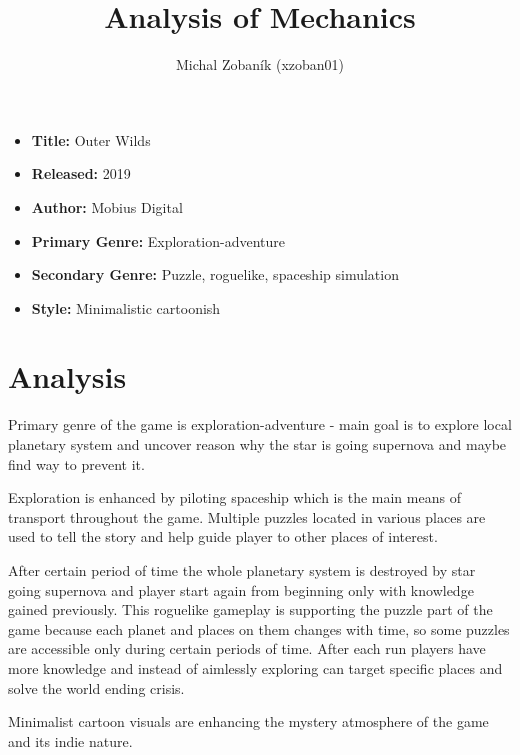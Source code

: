 \documentclass[a4paper,10pt,english]{article}
\title{%
Analysis of Mechanics%
}
\author{%
Michal Zobaník (xzoban01)%
}
\date{}
\begin{document}
\maketitle
\thispagestyle{empty}

{%
\large

\begin{itemize}

\item[] \textbf{Title:} Outer Wilds

\item[] \textbf{Released:} 2019

\item[] \textbf{Author:} Mobius Digital

\item[] \textbf{Primary Genre:} Exploration-adventure

\item[] \textbf{Secondary Genre:} Puzzle, roguelike, spaceship simulation 

\item[] \textbf{Style:} Minimalistic cartoonish

\end{itemize}

}

\section*{\centering Analysis}
Primary genre of the game is exploration-adventure - main goal is to explore local planetary system and uncover reason why the star is going supernova and maybe find way to prevent it.

Exploration is enhanced by piloting spaceship which is the main means of transport throughout the game. Multiple puzzles located in various places are used to tell the story and help guide player to other places of interest. 

After certain period of time the whole planetary system is destroyed by star going supernova and player start again from beginning only with knowledge gained previously. This roguelike gameplay is supporting the puzzle part of the game because each planet and places on them changes with time, so some puzzles are accessible only during certain periods of time. After each run players have more knowledge and instead of aimlessly exploring can target specific places and solve the world ending crisis. 

Minimalist cartoon visuals are enhancing the mystery atmosphere of the game and its indie nature.
\end{document}
